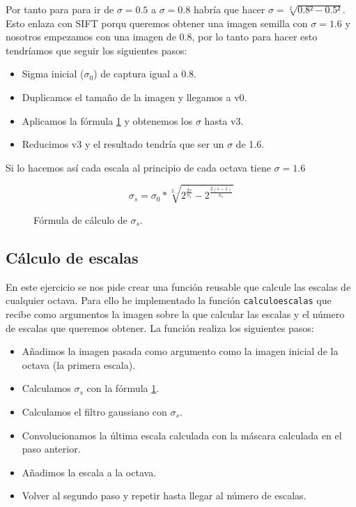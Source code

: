 \documentclass[12pt,spanish]{article}
\begin{document}
Por tanto para para ir de $\sigma = 0.5$ a $\sigma = 0.8$ habría que hacer $\sigma = \sqrt[2]{0.8² - 0.5²}$. Esto enlaza con SIFT porqu queremos obtener una imagen semilla con $\sigma = 1.6$ y nosotros empezamos con una imagen de 0.8, por lo tanto para hacer esto tendríamos que seguir los siguientes pasos:

\begin{itemize}
	\item Sigma inicial ($\sigma_0$) de captura igual a 0.8.
	\item Duplicamos el tamaño de la imagen y llegamos a v0.
	\item Aplicamos la fórmula \ref{calculo_sigma_s} y obtenemos los $\sigma$ hasta v3.
	\item Reducimos v3 y el resultado tendría que ser un $\sigma$ de 1.6.
\end{itemize}

Si lo hacemos así cada escala al principio de cada octava tiene $\sigma = 1.6$

\begin{figure}[H]
	\centering
	\[\sigma_s = \sigma_0 * \sqrt[2]{2^\frac{2s}{n_s} - 2^\frac{2(s-1)}{n_s}} \]
	\caption{Fórmula de  cálculo de $\sigma_s$.}
	\label{calculo_sigma_s}
\end{figure}

\subsection{Cálculo de escalas}
En este ejercicio se nos pide crear una función reusable que calcule las escalas de cualquier octava. Para ello he implementado la función \texttt{calculoescalas} que recibe como argumentos la imagen sobre la que calcular las escalas y el número de escalas que queremos obtener. La función realiza los siguientes pasos:


\begin{itemize}
	\item Añadimos la imagen pasada como argumento como la imagen inicial de la octava (la primera escala).
	\item Calculamos $\sigma_s$ con la fórmula \ref{calculo_sigma_s}.
	\item Calculamos el filtro gaussiano con $\sigma_s$.
	\item Convolucionamos la última escala calculada con la máscara calculada en el paso anterior.
	\item Añadimos la escala a la octava.
	\item Volver al segundo paso y repetir hasta llegar al número de escalas.
\end{itemize}
\end{document}
